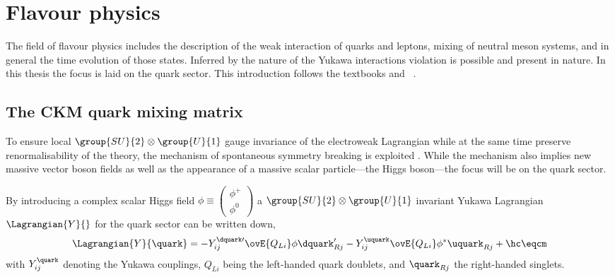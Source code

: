 
\section{Flavour physics}
\label{sec:cpv_theory:flavour_physics}

The field of flavour physics includes the description of the weak interaction of
quarks and leptons, mixing of neutral meson systems, and in general the time
evolution of those states. Inferred by the nature of the Yukawa interactions \CP
violation is possible and present in nature. In this thesis the focus is laid on
the quark sector. This introduction follows the textbooks
\cite{Branco:1999fs,Bigi:2000yz} and \Ref~\cite{Agashe:2014kda}.

\subsection{The \acs{CKM} quark mixing matrix}
\label{sec:cpv_theory:flavour_physics:ckm_matrix}

To ensure local $\group{SU}{2}\otimes\group{U}{1}$ gauge invariance of the
electroweak Lagrangian while at the same time preserve renormalisability of the
theory, the mechanism of spontaneous symmetry breaking is exploited
\cite{set:higgs}. While the mechanism also implies new massive vector boson
fields as well as the appearance of a massive scalar particle---the Higgs
boson---the focus will be on the quark sector.

By introducing a complex scalar Higgs field $\phi \equiv
\left(\begin{smallmatrix} \phi ^{+} \\ \phi^{0}\end{smallmatrix}\right)$ a
$\group{SU}{2}\otimes\group{U}{1}$ invariant Yukawa Lagrangian
$\Lagrangian{Y}{}$ for the quark sector can be written down,
%
\begin{equation}\label{sec:cpv_theory:flavour_physics:ckm_matrix:yukawa_lagrangian}
  \Lagrangian{Y}{\quark} = -Y_{ij}^{\dquark\prime} \ovE{Q_{Li}} \phi \dquark_{Rj}^{\prime} - Y_{ij}^{\uquark} \ovE{Q_{Li}} \phi^{\ast} \uquark_{Rj} + \hc \eqcm
\end{equation}
%
with $Y_{ij}^{\quark}$ denoting the Yukawa couplings, $Q_{Li}$ being the
left-handed quark doublets, and $\quark_{Rj}$ the right-handed singlets. 

